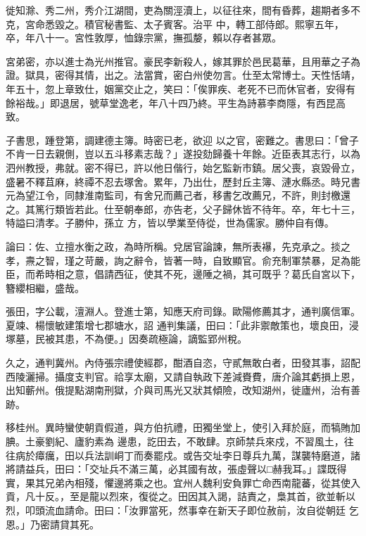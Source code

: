\begin{pinyinscope}
 徙知滁、秀二州，秀介江湖間，吏為關涇瀆上，以征往來，間有昏葬，趨期者多不克，宮命悉毀之。積官秘書監、太子賓客。治平
 中，轉工部侍郎。熙寧五年，卒，年八十一。宮性敦厚，恤錄宗黨，撫孤嫠，賴以存者甚眾。



 宮弟密，亦以進士為光州推官。豪民李新殺人，嫁其罪於邑民葛華，且用華之子為證。獄具，密得其情，出之。法當賞，密白州使勿言。仕至太常博士。天性恬靖，年五十，忽上章致仕，姻黨交止之，笑曰：「俟罪疾、老死不已而休官者，安得有餘裕哉。」即退居，號草堂逸老，年八十四乃終。平生為詩慕李商隱，有西昆高致。



 子書思，踵登第，調建德主簿。時密已老，欲迎
 以之官，密難之。書思曰：「曾子不肯一日去親側，豈以五斗移素志哉？」遂投劾歸養十年餘。近臣表其志行，以為泗州教授，弗就。密不得已，許以他日偕行，始乞監新市鎮。居父喪，哀毀骨立，盛暑不釋苴麻，終禫不忍去塚舍。累年，乃出仕，歷封丘主簿、漣水縣丞。時兄書元為望江令，同隸淮南監司，有舍兄而薦己者，移書乞改薦兄，不許，則封檄還之。其篤行類皆若此。仕至朝奉郎，亦告老，父子歸休皆不待年。卒，年七十三，特謚曰清孝。子勝仲，孫立
 方，皆以學業至侍從，世為儒家。勝仲自有傳。



 論曰：佐、立擅水衡之政，為時所稱。兌居官論諫，無所表襮，先克承之。掞之孝，燾之智，瑾之苛嚴，詢之辭令，皆著一時，自致顯官。俞充制軍禁暴，足為能臣，而希時相之意，倡請西征，使其不死，邊陲之禍，其可既乎？葛氏自宮以下，簪纓相繼，盛哉。



 張田，字公載，澶淵人。登進士第，知應天府司錄。歐陽修薦其才，通判廣信軍。夏竦、楊懷敏建策增七郡塘水，詔
 通判集議，田曰：「此非禦敵策也，壞良田，浸塚墓，民被其患，不為便。」因奏疏極論，謫監郢州稅。



 久之，通判冀州。內侍張宗禮使經郡，酣酒自恣，守貳無敢白者，田發其事，詔配西陵灑掃。攝度支判官。祫享太廟，又請自執政下差減賚費，唐介論其虧損上恩，出知蘄州。俄提點湖南刑獄，介與司馬光又狀其傾險，改知湖州，徙廬州，治有善跡。



 移桂州。異時蠻使朝貢假道，與方伯抗禮，田獨坐堂上，使引入拜於庭，而犒賄加腆。土豪劉紀、廬豹素為
 邊患，訖田去，不敢肆。京師禁兵來戍，不習風土，往往病於瘴癘，田以兵法訓峒丁而奏罷戍。或告交址李日尊兵九萬，謀襲特磨道，諸將請益兵，田曰：「交址兵不滿三萬，必其國有故，張虛聲以□赫我耳。」諜既得實，果其兄弟內相殘，懼邊將乘之也。宜州人魏利安負罪亡命西南龍蕃，從其使入貢，凡十反。，至是龍以烈來，復從之。田因其入謁，詰責之，梟其首，欲並斬以烈，叩頭流血請命。田曰：「汝罪當死，然事幸在新天子即位赦前，汝自從朝廷
 乞恩。」乃密請貸其死。




\end{pinyinscope}
